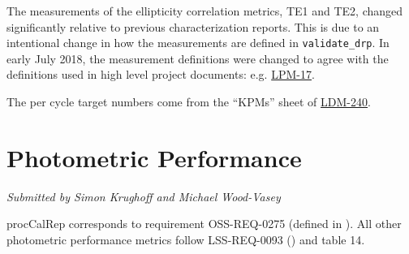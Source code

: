 \documentclass[DM,toc]{lsstdoc}
\begin{document}
The measurements of the ellipticity correlation metrics, TE1 and TE2, changed significantly relative to previous characterization reports.  This is
due to an intentional change in how the measurements are defined in \texttt{validate\_drp}. In early July 2018, the measurement definitions were changed
to agree with the definitions used in high level project documents: e.g. \href{http://ls.st/LPM-17}{LPM-17}.

The per cycle target numbers come from the ``KPMs'' sheet of \href{http://ls.st/LDM-240}{LDM-240}.

\section{Photometric Performance}\label{photometric-performance}

\emph{Submitted by Simon Krughoff and Michael Wood-Vasey}

procCalRep corresponds to requirement OSS-REQ-0275 (defined in
). All other photometric performance
metrics follow LSS-REQ-0093 () and
 table 14.
\end{document}
